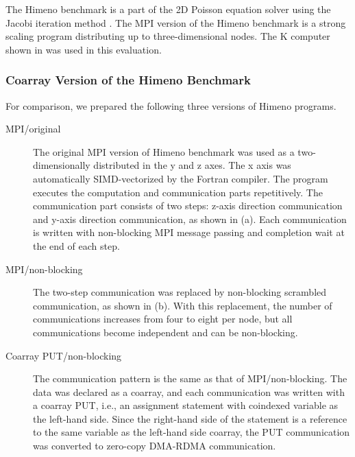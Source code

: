 The Himeno benchmark is a part of the 2D Poisson equation solver using the Jacobi 
iteration method \cite{himeno}. 
The MPI version of the Himeno benchmark is a strong scaling program distributing
up to three-dimensional nodes. 
%
The K computer shown in  was used in this evaluation.

\subsubsection{Coarray Version of the Himeno Benchmark}

For comparison, we prepared the following three versions of Himeno programs.

\begin{description}
\item [MPI/original]
The original MPI version of Himeno benchmark was used as a two-dimensionally 
distributed in the y and z axes. The x axis was automatically SIMD-vectorized 
by the Fortran compiler.
The program executes the computation and communication parts repetitively.
The communication part consists of two steps: z-axis direction communication 
and y-axis direction communication, as shown in (a).
Each communication is written with non-blocking MPI message passing and
completion wait at the end of each step.

\item [MPI/non-blocking]
The two-step communication was replaced by non-blocking scrambled communication,
as shown in (b).
With this replacement, the number of communications increases from four to eight 
per node, but all communications become independent and can be non-blocking.

\item [Coarray PUT/non-blocking]
The communication pattern is the same as that of MPI/non-blocking.
The data was declared as a coarray, and each communication was written with
a coarray PUT, i.e., an assignment statement with coindexed variable as 
the left-hand side. Since the right-hand side of the statement is a reference
to the same variable as the left-hand side coarray, the PUT communication
was converted to zero-copy DMA-RDMA communication.

\end{description}

